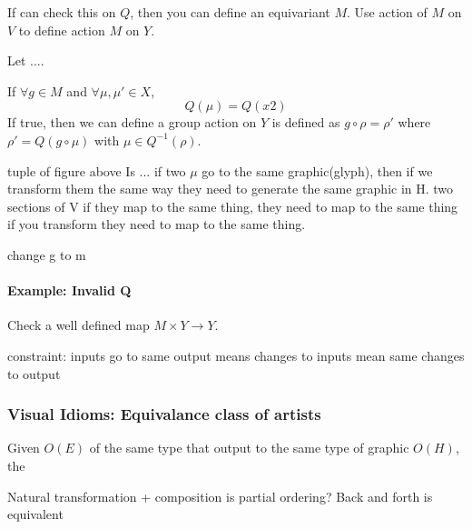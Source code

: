 \documentclass[../main.tex]{subfiles}
\begin{document}
If can check this on $Q$, then you can define an equivariant $M$. Use action of $M$ on $V$ to define action $M$ on $Y$. 

Let ....

If $\forall g \in M$ and $\forall \mu, \mu\prime \in X$, 
\begin{equation}
Q(\mu) = Q(x2) 
\end{equation}
If true, then we can define a group action on $Y$ is defined as $g\circ \rho = \rho\prime$ where $\rho\prime=Q(g\circ \mu)$ with $\mu \in Q^{-1}(\rho)$.

tuple of figure above Is ... %
if two $\mu$ go to the same graphic(glyph), then if we transform them the same way they need to generate the same graphic in H. two sections of V if they map to the same thing, they need to map to the same thing if you transform they need to map to the same thing. 

change g to  m


\paragraph{Example: Invalid Q}
Check a well defined map $M\times Y \rightarrow Y$.


constraint: inputs go to same output means changes to inputs mean same changes to output

\subsubsection{Visual Idioms: Equivalance class of artists}
Given $O(E)$ of the same type that output to the same type of graphic $O(H)$, the 


Natural transformation + composition is partial ordering? Back and forth is equivalent 
\end{document}

